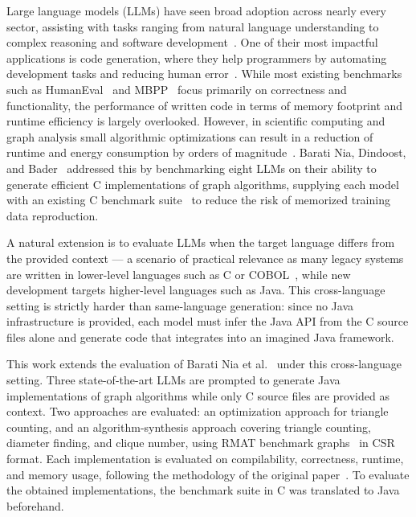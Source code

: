 Large language models (LLMs) have seen broad adoption across nearly every sector, assisting with tasks ranging from natural language understanding to complex reasoning and software development~\cite{chang2024survey}. One of their most impactful applications is code generation, where they help programmers by automating development tasks and reducing human error~\cite{llmgen2025}. While most existing benchmarks such as HumanEval~\cite{chen2021evaluatinglargelanguagemodels} and MBPP~\cite{austin2021programsynthesislargelanguage} focus primarily on correctness and functionality, the performance of written code in terms of memory footprint and runtime efficiency is largely overlooked. However, in scientific computing and graph analysis small algorithmic optimizations can result in a reduction of runtime and energy consumption by orders of magnitude~\cite{llmgen2025}. Barati Nia, Dindoost, and Bader~\cite{llmgen2025} addressed this by benchmarking eight LLMs on their ability to generate efficient C implementations of graph algorithms, supplying each model with an existing C benchmark suite~\cite{bader2023tc} to reduce the risk of memorized training data reproduction.

A natural extension is to evaluate LLMs when the target language differs from the provided context --- a scenario of practical relevance as many legacy systems are written in lower-level languages such as C or COBOL~\cite{cobol2000}, while new development targets higher-level languages such as Java. This cross-language setting is strictly harder than same-language generation: since no Java infrastructure is provided, each model must infer the Java API from the C source files alone and generate code that integrates into an imagined Java framework.

This work extends the evaluation of Barati Nia et al.~\cite{llmgen2025} under this cross-language setting. Three state-of-the-art LLMs are prompted to generate Java implementations of graph algorithms while only C source files are provided as context. Two approaches are evaluated: an optimization approach for triangle counting, and an algorithm-synthesis approach covering triangle counting, diameter finding, and clique number, using RMAT benchmark graphs~\cite{rmat2004} in CSR format. Each implementation is evaluated on compilability, correctness, runtime, and memory usage, following the methodology of the original paper~\cite{llmgen2025}. To evaluate the obtained implementations, the benchmark suite in C was translated to Java beforehand.

